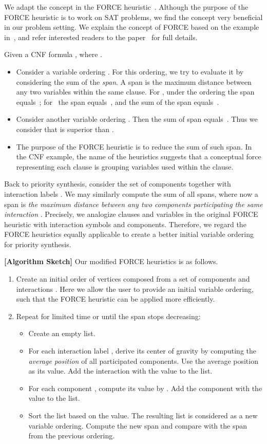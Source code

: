 \documentclass[10pt, a4paper, onecolumn, conference, compsocconf]{IEEEtran}
\begin{document}
We adapt the concept in the FORCE heuristic~\cite{aloul2003force}. Although the purpose of the FORCE heuristic is to work on SAT problems, we find the concept very beneficial in our problem setting. We explain the concept of FORCE based on the example in~\cite{aloul2003force}, and refer interested readers to the paper~\cite{aloul2003force} for full details.

Given a CNF formula , where .
\begin{itemize}
    \item Consider a variable ordering . For this ordering, we try to evaluate it by considering the sum of the \emph{span}. A span is the maximum distance between any two variables within the same clause. For , under the ordering the span equals~; for~ the span equals~, and the sum of the span equals~.
    \item Consider another variable ordering . Then the sum of span equals~. Thus we consider that  is superior than .
    \item The purpose of the FORCE heuristic is to reduce the sum of such span. In the CNF example, the name of the heuristics suggests that a conceptual force representing each clause is grouping variables used within the clause.
\end{itemize}

Back to priority synthesis, consider the set of components  together with interaction labels .
We may similarly compute the sum of all spans, where now a span is \emph{the maximum distance between any two components
participating the same interaction }. Precisely, we analogize clauses and variables in the original FORCE heuristic with interaction symbols and components. Therefore, we regard the FORCE heuristics equally applicable to create a
better initial variable ordering for priority synthesis.

\noindent\textbf{[Algorithm Sketch]} Our modified FORCE heuristics is as follows.
\begin{enumerate}
    \item Create an initial order of vertices composed from a set of components  and interactions . Here we allow the user to provide an initial variable ordering, such that the FORCE heuristic can be applied more efficiently.
    \item Repeat for limited time or until the span stops decreasing:
        \begin{itemize}
            \item Create an empty list.
            \item For each interaction label , derive its center of gravity  by computing the \emph{average position} of all participated components. Use the average position as its value. Add the interaction with the value to the list.
            \item For each component , compute its value by . Add the component with the value to the list.
            \item Sort the list based on the value. The resulting list is considered as a new variable ordering. Compute the new span and compare with the span from the previous ordering.
        \end{itemize}
\end{enumerate}
\end{document}
